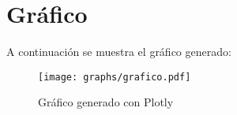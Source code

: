 \documentclass{article}
\begin{document}
\section{Gráfico}

A continuación se muestra el gráfico generado:

\begin{figure}[h]
    \centering
    \texttt{[image: graphs/grafico.pdf]} %
    \caption{Gráfico generado con Plotly}
    \label{fig:grafico}
\end{figure}
\end{document}
